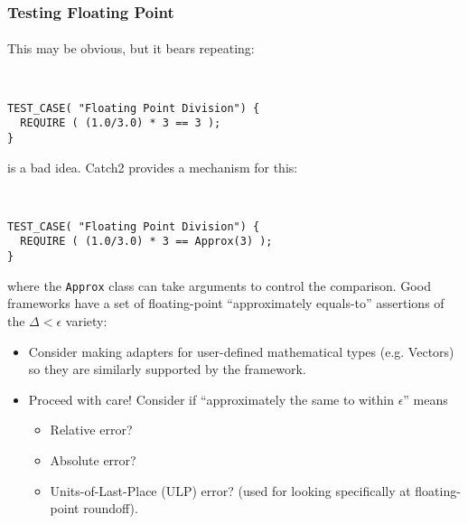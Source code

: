 
\begin{frame}[fragile,t]
\frametitle{Testing Floating Point}
\framesubtitle{}
This may be obvious, but it bears repeating:
{\scriptsize\
\begin{verbatim}
TEST_CASE( "Floating Point Division") {
  REQUIRE ( (1.0/3.0) * 3 == 3 );
}
\end{verbatim}}
is a bad idea. Catch2 provides a mechanism for this:
{\scriptsize\
\begin{verbatim}
TEST_CASE( "Floating Point Division") {
  REQUIRE ( (1.0/3.0) * 3 == Approx(3) );
}
\end{verbatim}}
where the \texttt{Approx} class can take arguments to control the comparison.
 Good frameworks have a set of floating-point
``approximately equals-to'' assertions of the $\Delta < \epsilon$
variety:
\begin{itemize}
  \item Consider making adapters for user-defined mathematical types
    (e.g. Vectors) so they are similarly supported by the framework.
  \item Proceed with care!  Consider if ``approximately the same to
    within $\epsilon$'' means
\begin{itemize}
  \item Relative error?
  \item Absolute error?
  \item Units-of-Last-Place (ULP) error?  (used for looking
    specifically at floating-point roundoff).
\end{itemize}
\end{itemize}
\end{frame}

